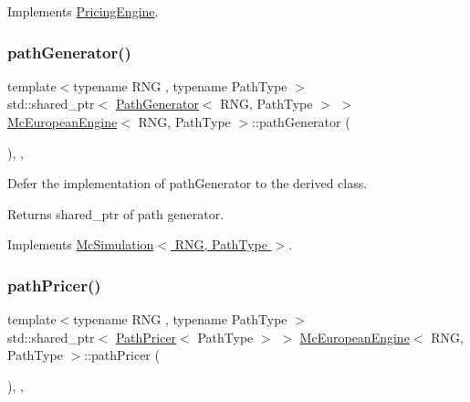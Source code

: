 Implements \hyperlink{class_pricing_engine_a733511ffc3cf5e4dc1fbc2a39208d8bd}{Pricing\+Engine}.

\hypertarget{class_mc_european_engine_a1e4fff8cadebec5aae259fc747dc12a3}{}\label{class_mc_european_engine_a1e4fff8cadebec5aae259fc747dc12a3} 
\subsubsection{\texorpdfstring{path\+Generator()}{pathGenerator()}}
{\footnotesize\ttfamily template$<$typename R\+NG , typename Path\+Type $>$ \\
std\+::shared\+\_\+ptr$<$ \hyperlink{class_path_generator}{Path\+Generator}$<$ R\+NG, Path\+Type $>$ $>$ \hyperlink{class_mc_european_engine}{Mc\+European\+Engine}$<$ R\+NG, Path\+Type $>$\+::path\+Generator (\begin{DoxyParamCaption}{ }\end{DoxyParamCaption})\hspace{0.3cm}{\ttfamily [override]}, {\ttfamily [private]}, {\ttfamily [virtual]}}



Defer the implementation of path\+Generator to the derived class. 

\begin{DoxyReturn}{Returns}
shared\+\_\+ptr of path generator. 
\end{DoxyReturn}


Implements \hyperlink{class_mc_simulation_ad2338ca624a9bbfaec8e4d882471d546}{Mc\+Simulation$<$ R\+N\+G, Path\+Type $>$}.

\hypertarget{class_mc_european_engine_ab07c50b4305c3e65f68ce3f0c9b740d6}{}\label{class_mc_european_engine_ab07c50b4305c3e65f68ce3f0c9b740d6} 
\subsubsection{\texorpdfstring{path\+Pricer()}{pathPricer()}}
{\footnotesize\ttfamily template$<$typename R\+NG , typename Path\+Type $>$ \\
std\+::shared\+\_\+ptr$<$ \hyperlink{class_path_pricer}{Path\+Pricer}$<$ Path\+Type $>$ $>$ \hyperlink{class_mc_european_engine}{Mc\+European\+Engine}$<$ R\+NG, Path\+Type $>$\+::path\+Pricer (\begin{DoxyParamCaption}{ }\end{DoxyParamCaption})\hspace{0.3cm}{\ttfamily [override]}, {\ttfamily [private]}, {\ttfamily [virtual]}}



